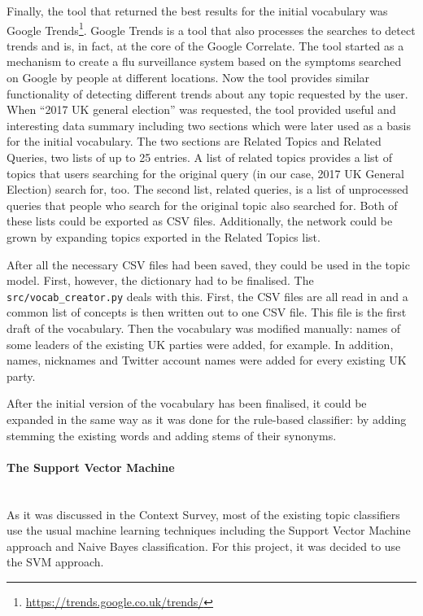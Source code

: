 Finally, the tool that returned the best results for the initial vocabulary was Google Trends\footnote{\url{https://trends.google.co.uk/trends/}}. Google Trends is a tool that also processes the searches to detect trends and is, in fact, at the core of the Google Correlate. The tool started as a mechanism to create a flu surveillance system based on the symptoms searched on Google by people at different locations. Now the tool provides similar functionality of detecting different trends about any topic requested by the user. When ``2017 UK general election'' was requested, the tool provided useful and interesting data summary including two sections which were later used as a basis for the initial vocabulary. The two sections are Related Topics and Related Queries, two lists of up to 25 entries. A list of related topics provides a list of topics that users searching for the original query (in our case, 2017 UK General Election) search for, too. The second list, related queries, is a list of unprocessed queries that people who search for the original topic also searched for. Both of these lists could be exported as CSV files. Additionally, the network could be grown by expanding topics exported in the Related Topics list.

After all the necessary CSV files had been saved, they could be used in the topic model. First, however, the dictionary had to be finalised. The \texttt{src/vocab\_creator.py} deals with this. First, the CSV files are all read in and a common list of concepts is then written out to one CSV file. This file is the first draft of the vocabulary. Then the vocabulary was modified manually: names of some leaders of the existing UK parties were added, for example. In addition, names, nicknames and Twitter account names were added for every existing UK party. 

After the initial version of the vocabulary has been finalised, it could be expanded in the same way as it was done for the rule-based classifier: by adding stemming the existing words and adding stems of their synonyms.

\paragraph{The Support Vector Machine}\mbox{}\\
As it was discussed in the Context Survey, most of the existing topic classifiers use the usual machine learning techniques including the Support Vector Machine approach and Naive Bayes classification. For this project, it was decided to use the SVM approach. 

